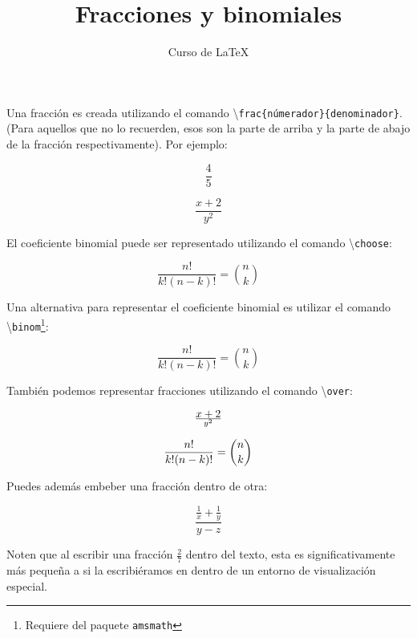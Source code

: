 \documentclass[12pt,letterpaper]{article}
\author{Curso de \LaTeX}
\title{Fracciones y binomiales}
\begin{document}
\maketitle

Una fracción es creada utilizando el comando \textbackslash \texttt{frac\{númerador\}\{denominador\}}. (Para aquellos que no lo recuerden, esos son la parte de arriba y la parte de abajo de la fracción respectivamente). Por ejemplo:

\begin{equation}
\frac{4}{5}
\end{equation}

\begin{equation}
\frac{x + 2}{y^2}
\end{equation}

El coeficiente binomial puede ser representado utilizando el comando \textbackslash \texttt{choose}:

\begin{displaymath}
	\frac{n!}{k!(n-k)!} = {n \choose k}
\end{displaymath}

Una alternativa para representar el coeficiente binomial es utilizar el comando \textbackslash \texttt{binom}\footnote{Requiere del paquete \texttt{amsmath}}:

\begin{displaymath}
\frac{n!}{k!(n-k)!} = \binom{n}{k}
\end{displaymath}

También podemos representar fracciones utilizando el comando \textbackslash\texttt{over}:

\begin{equation}
x + 2 \over y^2
\end{equation}

\begin{equation}
{n! \over k!(n-k)!} = {n \choose k}
\end{equation}

Puedes además embeber una fracción dentro de otra:

\begin{displaymath}
\frac{\frac{1}{x}+\frac{1}{y}}{y-z}
\end{displaymath}

Noten que al escribir una fracción $ \frac{2}{7} $ dentro del texto, esta es significativamente más pequeña a si la escribiéramos en dentro de un entorno de visualización especial.
\end{document}
